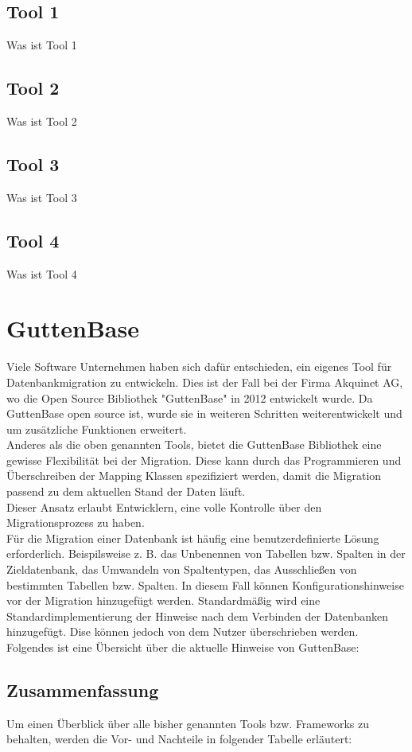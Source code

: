 \subsection{Tool 1}
Was ist Tool 1
\subsection{Tool 2}
Was ist Tool 2
\subsection{Tool 3}
Was ist Tool 3
\subsection{Tool 4}
Was ist Tool 4
\section{GuttenBase}
Viele Software Unternehmen haben sich dafür entschieden, ein eigenes Tool für Datenbankmigration zu entwickeln. Dies ist der Fall bei der Firma Akquinet AG, wo die Open Source Bibliothek "GuttenBase" in 2012 entwickelt wurde. Da GuttenBase open source ist, wurde sie in weiteren Schritten weiterentwickelt und um zusätzliche Funktionen erweitert.\\
Anderes als die oben genannten Tools, bietet die GuttenBase Bibliothek eine gewisse Flexibilität bei der Migration. Diese kann durch das Programmieren und Überschreiben der Mapping Klassen spezifiziert werden, damit die Migration passend zu dem aktuellen Stand der Daten läuft.\\
Dieser Ansatz erlaubt Entwicklern, eine volle Kontrolle über den Migrationsprozess zu haben.\\
Für die Migration einer Datenbank ist häufig eine benutzerdefinierte Lösung erforderlich. Beispilsweise z. B. das Unbenennen von Tabellen bzw. Spalten in der Zieldatenbank, das Umwandeln von Spaltentypen, das Ausschließen von bestimmten Tabellen bzw. Spalten.
In diesem Fall können Konfigurationshinweise vor der Migration hinzugefügt werden. Standardmäßig wird eine Standardimplementierung der Hinweise nach dem Verbinden der Datenbanken hinzugefügt. Dise können jedoch von dem Nutzer überschrieben werden. \\
Folgendes ist eine Übersicht über die aktuelle Hinweise von GuttenBase: \\


\subsection{Zusammenfassung}
Um einen Überblick über alle bisher genannten Tools bzw. Frameworks zu behalten, werden die Vor- und Nachteile in folgender Tabelle erläutert: \\
